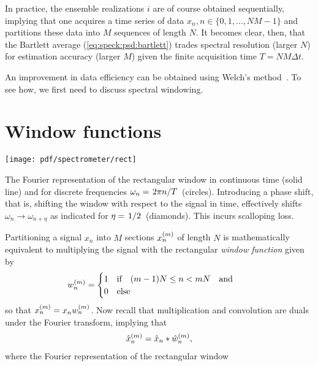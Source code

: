 In practice, the ensemble realizations $i$ are of course obtained sequentially, implying that one acquires a time series of data $x_n, n\in\lbrace0, 1, \dotsc, NM - 1\rbrace$ and partitions these data into $M$ sequences of length $N$.
It becomes clear, then, that the Bartlett average (\cref{eq:speck:psd:bartlett}) trades spectral resolution (larger $N$) for estimation accuracy (larger $M$) given the finite acquisition time $T = NM\Delta t$.

An improvement in data efficiency can be obtained using Welch's method~\cite{Welch1967}.
To see how, we first need to discuss spectral windowing.

\section{Window functions}\label{sec:speck:theory:windows}
\begin{marginfigure}[-2.25cm]
    \centering
    \texttt{[image: pdf/spectrometer/rect]}
    \caption{
        The Fourier representation of the rectangular window in continuous time (solid line) and for discrete frequencies $\omega_n = \flatfrac{2\pi n}{T}$ (circles).
        Introducing a phase shift, that is, shifting the window with respect to the signal in time, effectively shifts $\omega_n \to \omega_{n+\eta}$ as indicated for $\eta=\flatfrac{1}{2}$ (diamonds).
        This incurs scalloping loss.
    }
    \label{fig:boxcar_fourier}
\end{marginfigure}
Partitioning a signal $x_n$ into $M$ sections $x_n^{(m)}$ of length $N$ is mathematically equivalent to multiplying the signal with the rectangular \emph{window function} given by
\begin{align}\label{eq:speck:window:boxcar}
    w_n\gth{m} =
    \begin{cases}
        1\qif (m - 1) N \leq n < m N\qand \\
        0\qelse
    \end{cases}
\end{align}
so that $x_n^{(m)} = x_n w_n^{(m)}$.
Now recall that multiplication and convolution are duals under the Fourier transform, implying that
\begin{align}\label{eq:speck:window:ft_pairs}
    \hat{x}_n^{(m)} = \hat{x}_n \ast \hat{w}_n^{(m)},
\end{align}
where the Fourier representation of the rectangular window

